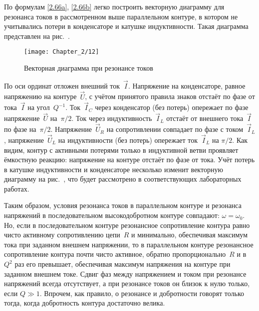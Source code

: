 По формулам \eqref{2.66a}, \eqref{2.66b} легко построить векторную диаграмму для
резонанса токов в рассмотренном выше параллельном контуре, в котором не
учитывались потери в конденсаторе и катушке индуктивности. Такая диаграмма
представлен на рис.~.

\begin{figure}[h!]
	\centering\texttt{[image: Chapter\_2/12]}
	\caption{Векторная диаграмма при резонансе токов}
\end{figure}

По оси ординат отложен внешний ток~$\vec I$. Напряжение на конденсаторе, равное
напряжению на контуре~$\vec U$, с учётом принятого правила знаков отстаёт по
фазе от тока~$\vec I$ на угол~$Q^{-1}$. Ток~$\vec I_C$ через конденсатор (без
потерь) опережает по фазе напряжение~$\vec U$ на~$\pi/2$. Ток через
индуктивность~$\vec I_L$ отстаёт от внешнего тока~$\vec I$ по фазе на~$\pi/2$.
Напряжение~$\vec U_R$ на сопротивлении совпадает по фазе с током~$\vec I_L$,
напряжение~$\vec U_L$ на индуктивности (без потерь) опережает ток~$\vec I_L$ на
$\pi/2$. Как видим, контур с активными потерями только в индуктивной ветви
проявляет ёмкостную реакцию: напряжение на контуре отстаёт по фазе от тока. Учёт
потерь в катушке индуктивности и конденсаторе несколько изменит векторную
диаграмму на рис.~, что будет рассмотрено в соответствующих
лабораторных работах.

Таким образом, условия резонанса токов в параллельном контуре и резонанса
напряжений в последовательном высокодобротном контуре совпадают:
$\omega=\omega_0$. Но, если в последовательном контуре резонансное сопротивление
контура равно чисто активному сопротивлению цепи~$R$ и минимально, обеспечивая
максимум тока при заданном внешнем напряжении, то в параллельном контуре
резонансное сопротивление контура почти чисто активное, обратно
пропорционально~$R$ и в~$Q^2$ раз его превышает, обеспечивая максимум напряжения
на контуре при заданном внешнем токе. Сдвиг фаз между напряжением и током при
резонансе напряжений всегда отсутствует, а при резонансе токов он близок к нулю
только, если $Q\gg1$. Впрочем, как правило, о резонансе и добротности говорят
только тогда, когда добротность контура достаточно велика.


